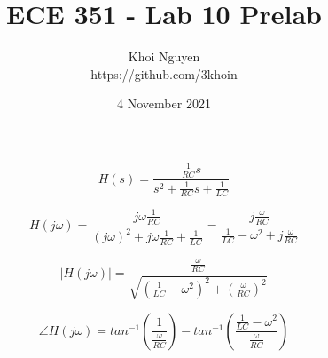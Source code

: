 \documentclass[11pt,a4,titlepage]{article}
\title{ECE 351 - Lab 10 Prelab}
\author{Khoi Nguyen \\ https://github.com/3khoin}
\date{4 November 2021}
\begin{document}
\maketitle
\pagebreak

\[H(s) = \frac{\frac{1}{RC}s}{s^{2} + \frac{1}{RC}s + \frac{1}{LC}}\]

\[H(j\omega) = \frac{j\omega\frac{1}{RC}}{(j\omega)^{2} + j\omega \frac{1}{RC} + \frac{1}{LC}} = \frac{j \frac{\omega}{RC}}{\frac{1}{LC} - \omega^{2} + j\frac{\omega}{RC}}\]

\[|H(j\omega)| = \frac{\frac{\omega}{RC}}{\sqrt{(\frac{1}{LC} - \omega^2)^{2} + (\frac{\omega}{RC})^{2}}}\]

\[\angle H(j\omega) = tan^{-1}(\frac{1}{\frac{\omega}{RC}}) - tan^{-1}(\frac{\frac{1}{LC} - \omega^{2}}{\frac{\omega}{RC}})\]
	
\end{document}
